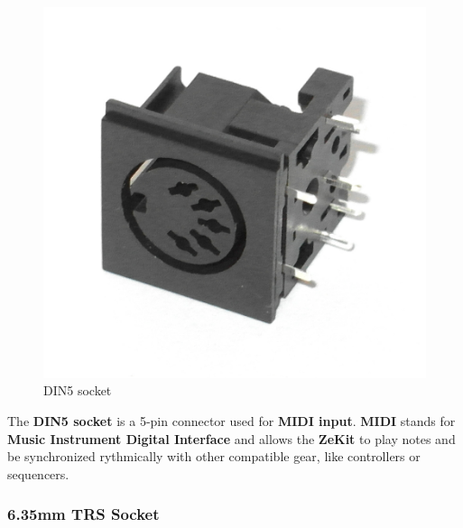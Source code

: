\documentclass{scrartcl}
\begin{document}
\begin{figure}[!ht]
    \begin{center}
        \includegraphics[scale=0.15]{assets/zekit-din.jpg}
        \caption{DIN5 socket}
    \end{center}
\end{figure}

The \textbf{DIN5 socket} is a 5-pin connector used for \textbf{MIDI input}. \textbf{MIDI} stands for \textbf{Music Instrument Digital Interface} and allows the \textbf{ZeKit} to play notes and be synchronized rythmically with other compatible gear, like controllers or sequencers.

\subsubsection{6.35mm TRS Socket}
\end{document}
